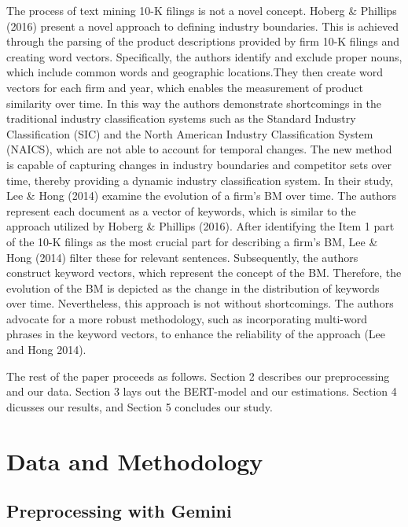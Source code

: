 \documentclass[
]{article}
\begin{document}
The process of text mining 10-K filings is not a novel concept. Hoberg
\& Phillips (2016) present a novel approach to defining industry
boundaries. This is achieved through the parsing of the product
descriptions provided by firm 10-K filings and creating word vectors.
Specifically, the authors identify and exclude proper nouns, which
include common words and geographic locations.They then create word
vectors for each firm and year, which enables the measurement of product
similarity over time. In this way the authors demonstrate shortcomings
in the traditional industry classification systems such as the Standard
Industry Classification (SIC) and the North American Industry
Classification System (NAICS), which are not able to account for
temporal changes. The new method is capable of capturing changes in
industry boundaries and competitor sets over time, thereby providing a
dynamic industry classification system. In their study, Lee \& Hong
(2014) examine the evolution of a firm's BM over time. The authors
represent each document as a vector of keywords, which is similar to the
approach utilized by Hoberg \& Phillips (2016). After identifying the
Item 1 part of the 10-K filings as the most crucial part for describing
a firm's BM, Lee \& Hong (2014) filter these for relevant sentences.
Subsequently, the authors construct keyword vectors, which represent the
concept of the BM. Therefore, the evolution of the BM is depicted as the
change in the distribution of keywords over time. Nevertheless, this
approach is not without shortcomings. The authors advocate for a more
robust methodology, such as incorporating multi-word phrases in the
keyword vectors, to enhance the reliability of the approach (Lee and
Hong 2014).

The rest of the paper proceeds as follows. Section 2 describes our
preprocessing and our data. Section 3 lays out the BERT-model and our
estimations. Section 4 dicusses our results, and Section 5 concludes our
study.

\section{Data and Methodology}\label{data-and-methodology}

\subsection{Preprocessing with Gemini}\label{preprocessing-with-gemini}
\end{document}

